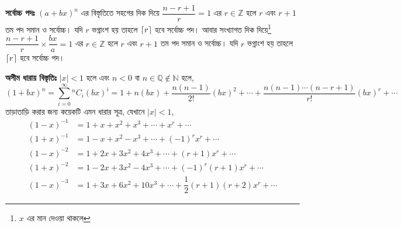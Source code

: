 \documentclass[a4paper,12pt]{article}
\DeclarePairedDelimiter\ceil{\lceil}{\rceil}
\newcommand*{\comb}[2]{{}^{#1}C_{#2}}%
\begin{document}
\textbf{সর্বোচ্চ পদঃ} $(a+bx)^n$ এর বিস্তৃতিতে সহগের দিক দিয়ে $\dfrac{n-r+1}{r}=1$ এর $r \in \mathbb{Z}$ হলে $r$ এবং $r+1$ তম পদ সমান ও সর্বোচ্চ। যদি $r$ ভগ্নাংশ হয় তাহলে $\ceil{r}$ হবে সর্বোচ্চ পদ। আবার সংখ্যাগত দিক দিয়ে\footnote{$x$ এর মান দেওয়া থাকলে} $\dfrac{n-r+1}{r}\times \dfrac{bx}{a} =1$ এর $r \in \mathbb{Z}$ হলে $r$ এবং $r+1$ তম পদ সমান ও সর্বোচ্চ। যদি $r$ ভগ্নাংশ হয় তাহলে $\ceil{r}$ হবে সর্বোচ্চ পদ। 

\textbf{অসীম ধারায় বিস্তৃতিঃ} $|x|<1$ হলে এবং $n <0$ বা $n \in \mathbb{Q} \notin \mathbb{N}$ হলে, 
\[ (1+bx)^n=\sum_{i=0}^{\infty} \comb{n}{i}(bx)^i= 1+n(bx)+ \dfrac{n(n-1)}{2!}(bx)^2+\cdots+\dfrac{n(n-1)\cdots(n-r+1)}{r!}(bx)^r+\cdots\]
তাড়াতাড়ি করার জন্য কয়েকটি এমন ধারার সূত্র, যেখানে $|x|<1$, 
\begin{align*}
    (1-x)^{-1} &= 1+x+x^2+x^3+\cdots + x^r+ \cdots\\
    (1+x)^{-1} &= 1-x+x^2-x^3+\cdots + (-1)^rx^r+ \cdots\\
    (1-x)^{-2} &= 1+2x+3x^2+4x^3+\cdots+(r+1)x^r+\cdots\\
    (1+x)^{-2} &= 1-2x+3x^2-4x^3+\cdots+(-1)^r(r+1)x^r+\cdots\\
    (1-x)^{-3} &= 1+3x+6x^2+10x^3+\cdots+\dfrac{1}{2}(r+1)(r+2)x^r+\cdots
\end{align*}

\newpage
\end{document}
